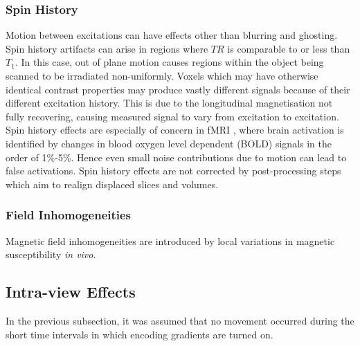 \documentclass[class=article, crop=false]{standalone}
\begin{document}
\subsubsection*{Spin History}
Motion between excitations can have effects other than blurring and ghosting. Spin history artifacts can arise in regions where $TR$ is comparable to or less than $T_1$. In this case, out of plane motion causes regions within the object being scanned to be irradiated non-uniformly. Voxels which may have otherwise identical contrast properties may produce vastly different signals because of their different excitation history. This is due to the longitudinal magnetisation not fully recovering, causing measured signal to vary from excitation to excitation. Spin history effects are especially of concern in fMRI \parencite{Friston1996,Muresan2005}, where brain activation is identified by changes in blood oxygen level dependent (BOLD) signals in the order of 1\%-5\%. Hence even small noise contributions due to motion can lead to false activations. Spin history effects are not corrected by post-processing steps which aim to realign displaced slices and volumes.

\subsubsection*{Field Inhomogeneities}
Magnetic field inhomogeneities are introduced by local variations in magnetic susceptibility \textit{in vivo}.

\subsection{Intra-view Effects}
In the previous subsection, it was assumed that no movement occurred during the short time intervals in which encoding gradients are turned on.
\end{document}

